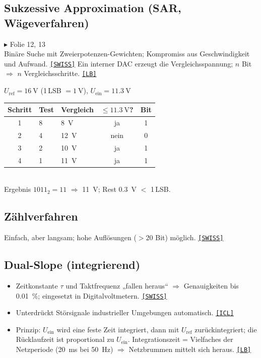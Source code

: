 \documentclass[11pt,a4paper]{article}
\newcommand{\q}[1]{\hyperlink{src:#1}{\textcolor{quelle}{\texttt{\footnotesize[#1]}}}}
\newcommand{\folie}[1]{\textcolor{akzent}{\footnotesize\textsf{$\blacktriangleright$ Folie #1}}}
\begin{document}
\subsection{Sukzessive Approximation (SAR, Wägeverfahren)}\label{sec:sar}
\folie{12, 13}\\
Binäre Suche mit Zweierpotenzen-Gewichten; Kompromiss aus Geschwindigkeit und Aufwand. \q{SWISS}
Ein interner DAC erzeugt die Vergleichsspannung; $n$ Bit $\Rightarrow$ $n$ Vergleichsschritte. \q{LB}
\begin{beispiel}
$U_\text{ref}=\SI{16}{\volt}$ (1\,LSB $=\SI{1}{\volt}$), $U_\text{ein}=\SI{11.3}{\volt}$\\[1mm]
\begin{tabular}{@{}cllcc@{}}
\toprule
Schritt & Test & Vergleich & $\leq\SI{11.3}{\volt}$? & Bit\\ \midrule
1 & 8 & \SI{8}{\volt} & ja & 1\\
2 & 4 & \SI{12}{\volt} & nein & 0\\
3 & 2 & \SI{10}{\volt} & ja & 1\\
4 & 1 & \SI{11}{\volt} & ja & 1\\
\bottomrule
\end{tabular}\\[1mm]
Ergebnis $1011_2=11$ $\Rightarrow$ \SI{11}{\volt}; Rest \SI{0.3}{\volt} $<$ 1\,LSB.
\end{beispiel}

\subsection{Zählverfahren}
Einfach, aber langsam; hohe Auflösungen ($>20$ Bit) möglich. \q{SWISS}

\subsection{Dual-Slope (integrierend)}\label{sec:dualslope}
\begin{itemize}
  \item Zeitkonstante $\tau$ und Taktfrequenz „fallen heraus“ $\Rightarrow$ Genauigkeiten bis \SI{0.01}{\percent}; eingesetzt in Digitalvoltmetern. \q{SWISS}
  \item Unterdrückt Störsignale industrieller Umgebungen automatisch. \q{ICL}
  \item Prinzip: $U_\text{ein}$ wird eine feste Zeit integriert, dann mit $U_\text{ref}$ zurückintegriert; die Rücklaufzeit ist proportional zu $U_\text{ein}$. Integrationszeit = Vielfaches der Netzperiode (\SI{20}{\milli\second} bei \SI{50}{\hertz}) $\Rightarrow$ Netzbrummen mittelt sich heraus. \q{LB}
\end{itemize}
\end{document}
